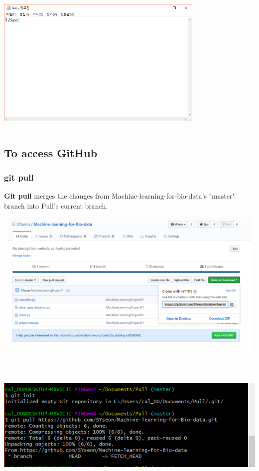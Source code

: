 \documentclass[11pt]{article}
\begin{document}
	\includegraphics[height=7cm, width=10cm]{branch00.PNG}
	
	\subsection{To access GitHub}
		\subsubsection{git pull}
		 \textbf{Git pull} merges the changes from Machine-learning-for-bio-data’s "master" branch into Pull’s current branch.	
		
		\includegraphics[height=7cm, width=14cm]{gitpull01.PNG}
		
		\includegraphics[height=7cm, width=14cm]{gitpull02.PNG}
		
\end{document}

